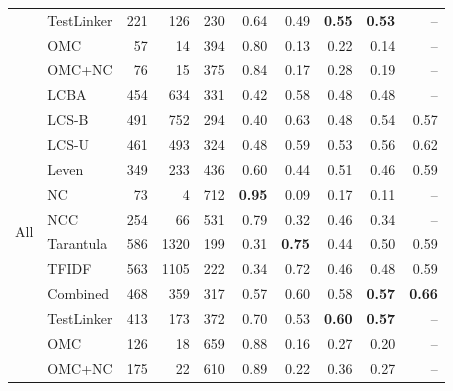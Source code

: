\begin{tabular}{llrrrrrrrr}
 & TestLinker & 221 & 126 & 230 & 0.64 & 0.49 & \textbf{0.55} & \textbf{0.53} & -- \\
 & OMC & 57 & 14 & 394 & 0.80 & 0.13 & 0.22 & 0.14 & -- \\
 & OMC+NC & 76 & 15 & 375 & 0.84 & 0.17 & 0.28 & 0.19 & -- \\
\midrule
\multirow{12}{*}{All} & LCBA & 454 & 634 & 331 & 0.42 & 0.58 & 0.48 & 0.48 & -- \\
 & LCS-B & 491 & 752 & 294 & 0.40 & 0.63 & 0.48 & 0.54 & 0.57 \\
 & LCS-U & 461 & 493 & 324 & 0.48 & 0.59 & 0.53 & 0.56 & 0.62 \\
 & Leven & 349 & 233 & 436 & 0.60 & 0.44 & 0.51 & 0.46 & 0.59 \\
 & NC & 73 & 4 & 712 & \textbf{0.95} & 0.09 & 0.17 & 0.11 & -- \\
 & NCC & 254 & 66 & 531 & 0.79 & 0.32 & 0.46 & 0.34 & -- \\
 & Tarantula & 586 & 1320 & 199 & 0.31 & \textbf{0.75} & 0.44 & 0.50 & 0.59 \\
 & TFIDF & 563 & 1105 & 222 & 0.34 & 0.72 & 0.46 & 0.48 & 0.59 \\
 & Combined & 468 & 359 & 317 & 0.57 & 0.60 & 0.58 & \textbf{0.57} & \textbf{0.66} \\
 & TestLinker & 413 & 173 & 372 & 0.70 & 0.53 & \textbf{0.60} & \textbf{0.57} & -- \\
 & OMC & 126 & 18 & 659 & 0.88 & 0.16 & 0.27 & 0.20 & -- \\
 & OMC+NC & 175 & 22 & 610 & 0.89 & 0.22 & 0.36 & 0.27 & -- \\

\bottomrule
\end{tabular}

